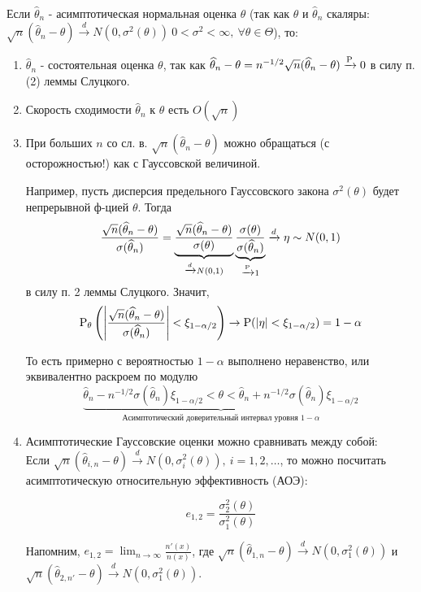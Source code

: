 Если \(\widehat{\theta}_n\) - асимптотическая нормальная оценка \(\theta\) (так как \(\theta\) и \(\widehat{\theta}_n\) скаляры:
\(\sqrt{n}(\widehat{\theta}_n - \theta) \xrightarrow{d} N(0, \sigma^2(\theta)) \ 0 < \sigma^2 < \infty,\ \forall \theta \in \Theta\)), то:
\begin{enumerate}
    \item \(\widehat{\theta}_n\) - состоятельная оценка \(\theta\), так как \(\widehat{\theta}_n - \theta = n^{-1/2} \sqrt{n}(\widehat{\theta}_n - \theta) \xrightarrow{\P} 0\)
        в силу п. (2) леммы Слуцкого.
    \item Скорость сходимости \(\widehat{\theta}_n\) к \(\theta\) есть \(O(\sqrt{n})\)
    \item При больших \(n\) со сл. в. \(\sqrt{n}(\widehat{\theta}_n - \theta)\) можно обращаться (с осторожностью!) как с Гауссовской величиной.

    Например, пусть дисперсия предельного Гауссовского закона \(\sigma^2(\theta)\) будет непрерывной ф-цией \(\theta\). Тогда
    \[ \frac{\sqrt{n}(\widehat{\theta}_n - \theta)}{\sigma(\widehat{\theta}_n)} =
    \underbrace{\frac{\sqrt{n}(\widehat{\theta}_n - \theta)}{\sigma(\theta)}}_{\xrightarrow{d} N(0, 1)}
    \underbrace{\frac{\sigma(\theta)}{\sigma(\widehat{\theta}_n)}}_{\xrightarrow{\P} 1} \xrightarrow{d} \eta \sim N(0, 1)\]
    в силу п. 2 леммы Слуцкого. Значит,
    \[\P_\theta \left(\left\lvert \frac{\sqrt{n}(\widehat{\theta}_n - \theta)}{\sigma(\widehat{\theta}_n)} \right\rvert  < \xi_{1 - \alpha/2}\right) \rightarrow \P(\left\lvert \eta \right\rvert  < \xi_{1 - \alpha/2}) = 1 - \alpha\]

    То есть примерно с вероятностью \(1 - \alpha\) выполнено неравенство, или эквивалентно раскроем по модулю
    \[\underbrace{\widehat{\theta}_n - n^{-1/2}\sigma(\widehat{\theta}_n)\xi_{1 - \alpha /2} < \theta < \widehat{\theta}_n + n^{-1/2}\sigma(\widehat{\theta}_n)\xi_{1 - \alpha /2}}_{\mbox{Асимптотический доверительный интервал уровня \(1 - \alpha\)}}\]

    \item Асимптотические Гауссовские оценки можно сравнивать между собой: \\
    Если \(\sqrt{n} (\widehat{\theta}_{i,n} - \theta) \xrightarrow{d} N(0, \sigma^2_{i}(\theta)),\ i = 1, 2, \ldots\), то
    можно посчитать асимптотическую относительную эффективность (АОЭ):

    \[e_{1,2} = \frac{\sigma_2^2(\theta)}{\sigma_1^2(\theta)}\]

    Напомним, $e_{1, 2} = \lim_{n \to \infty} \frac{n'(x)}{n (x)}$, где
    $\sqrt{n}(\widehat{\theta}_{1,n}-\theta)\xrightarrow{d}N(0, \sigma_1^2(\theta))$
    и \(\sqrt{n}(\widehat{\theta}_{2,n'} - \theta) \xrightarrow{d} N(0, \sigma_1^2(\theta))\).

\end{enumerate}

